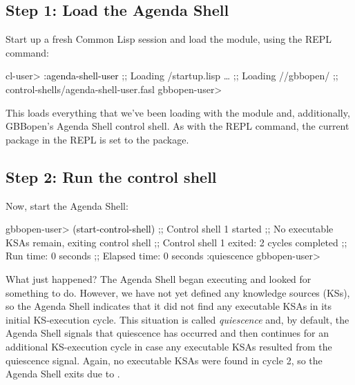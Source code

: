 \documentclass[10pt,twoside,english,pdftex]{article}
\begin{document}
\subsection*{Step 1: Load the Agenda Shell}

Start up a fresh Common Lisp session and load the
 module, using the
 REPL command:
%
\W\supp
\begin{smallexample}
\textcolor{darkergray}{%
  cl-user> \textcolor{black}{:agenda-shell-user}
  ;; Loading /startup.lisp
     \textrm{\ldots{}}
  ;; Loading //gbbopen/
  ;;            control-shells/agenda-shell-user.fasl
  gbbopen-user>}
\end{smallexample}

This loads everything that we've been loading with the
 module and, additionally, GBBopen's Agenda Shell
control shell. As with the  REPL command, the current
package in the REPL is set to the  package.

\subsection*{Step 2: Run the control shell}

%
%
Now, start the Agenda Shell:
%
\W\supp
\begin{example}
\textcolor{darkergray}{%
  gbbopen-user> \textcolor{black}{(start-control-shell)}
  ;; Control shell 1 started
  ;; No executable KSAs remain, exiting control shell
  ;; Control shell 1 exited: 2 cycles completed
  ;; Run time: 0 seconds
  ;; Elapsed time: 0 seconds
  :quiescence
  gbbopen-user>}
\end{example}

%
%
%
%
%
What just happened?  The Agenda Shell began executing and looked for something
to do.  However, we have not yet defined any knowledge sources (KSs), so the
Agenda Shell indicates that it did not find any executable KSAs in its initial
KS-execution cycle.  This situation is called \textit{quiescence} and, by
default, the Agenda Shell signals that quiescence has occurred and then
continues for an additional KS-execution cycle in case any executable KSAs
resulted from the quiescence signal.  Again, no executable KSAs were found in
cycle 2, so the Agenda Shell exits due to .
\end{document}
